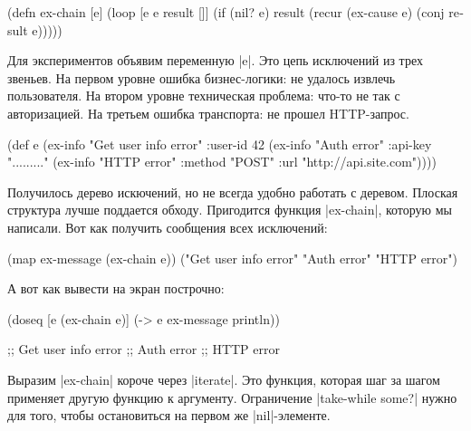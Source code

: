 \begin{english}
  \begin{clojure}
(defn ex-chain [e]
  (loop [e e
         result []]
    (if (nil? e)
      result
      (recur (ex-cause e) (conj result e)))))
  \end{clojure}
\end{english}

Для экспериментов объявим переменную \spverb|e|. Это цепь исключений из трех
звеньев. На первом уровне ошибка бизнес-логики: не удалось извлечь
пользователя. На втором уровне техническая проблема: что-то не так с
авторизацией. На третьем ошибка транспорта: не прошел HTTP-запрос.

\begin{english}
  \begin{clojure}
(def e
  (ex-info
   "Get user info error"
   {:user-id 42}
   (ex-info "Auth error"
            {:api-key "........."}
            (ex-info "HTTP error"
                     {:method "POST"
                      :url "http://api.site.com"}))))
  \end{clojure}
\end{english}

Получилось дерево искючений, но не всегда удобно работать с деревом. Плоская
структура лучше поддается обходу. Пригодится функция \spverb|ex-chain|, которую
мы написали. Вот как получить сообщения всех исключений:

\begin{english}
  \begin{clojure}
(map ex-message (ex-chain e))
("Get user info error" "Auth error" "HTTP error")
  \end{clojure}
\end{english}

\noindent
А вот как вывести на экран построчно:

\begin{english}
  \begin{clojure}
(doseq [e (ex-chain e)]
  (-> e ex-message println))

;; Get user info error
;; Auth error
;; HTTP error
  \end{clojure}
\end{english}

Выразим \spverb|ex-chain| короче через \spverb|iterate|. Это функция, которая
шаг за шагом применяет другую функцию к аргументу. Ограничение
\spverb|take-while some?| нужно для того, чтобы остановиться на первом же
\spverb|nil|-элементе.

